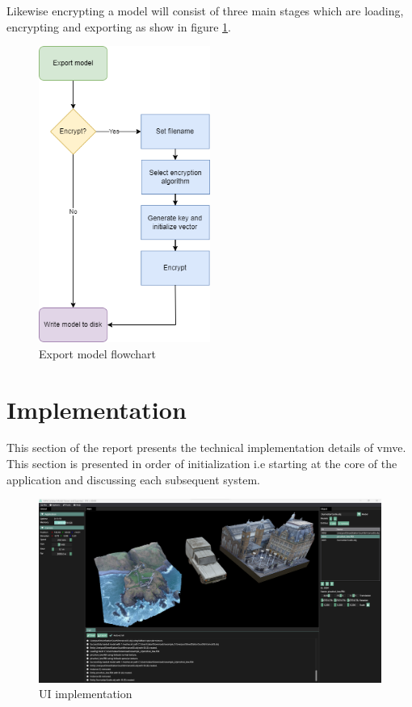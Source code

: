 \documentclass[11pt]{article}
\begin{document}
Likewise encrypting a model will consist of three main stages which are loading, encrypting
and exporting as show in figure \ref{fig:export_model_flowchart}.
\begin{figure}[H]
  \centering
  \includegraphics[width=0.5\textwidth]{images/export_model_flowchart.png}
  \caption{Export model flowchart}
  \label{fig:export_model_flowchart}
\end{figure}

\clearpage
\section{Implementation}
This section of the report presents the technical implementation details of
\gls*{vmve}. This section is presented in order of initialization i.e starting at
the core of the application and discussing each subsequent system.

\begin{figure}[H]
  \centering
  \includegraphics[width=\textwidth]{images/ui_implementation.png}
  \caption{UI implementation}
  \label{fig:user_interface}
\end{figure}
\end{document}
